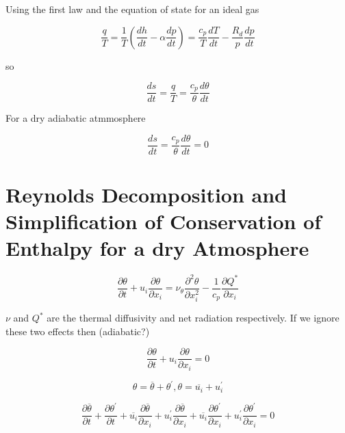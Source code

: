 Using the first law and the equation of state for an ideal gas

\begin{equation}
\frac{q}{T} = \frac{1}{T} \left(\frac{dh}{dt} - \alpha \frac{dp}{dt}\right) =  \frac{c_{p}}{T} \frac{dT}{dt} - \frac{R_{d}}{p} \frac{dp}{dt}
\end{equation}

so

\begin{equation}
\frac{ds}{dt} = \frac{q}{T} =  \frac{c_{p}}{\theta}\frac{d\theta}{dt}
\end{equation}

For a dry adiabatic atmmosphere

\begin{equation}
\frac{ds}{dt} =  \frac{c_{p}}{\theta}\frac{d\theta}{dt} = 0
\end{equation}

\section{Reynolds Decomposition and Simplification of Conservation of Enthalpy for a dry Atmosphere}

\begin{equation}
\frac{\partial \theta}{\partial t} + u_{i}\frac{\partial \theta}{\partial x_{i}} = \nu_{\theta} \frac{\partial^{2}\theta}{\partial x_{i}^{2}} - \frac{1}{c_{p}}\frac{\partial Q^{*}}{\partial x_{i}}
\end{equation}

$\nu$ and $Q^{*}$ are the thermal diffusivity and net radiation respectively.  If we ignore these two effects then (adiabatic?)

\begin{equation}
\frac{\partial \theta}{\partial t} + u_{i}\frac{\partial \theta}{\partial x_{i}} = 0
\end{equation}

\begin{equation}
\theta = \overline{\theta} + \theta^{'}, \theta = \overline{u_{i}} + u_{i}^{'} 
\end{equation}

\begin{equation}
\frac{\partial \overline{\theta}}{\partial t} + \frac{\partial \theta^{'}}{\partial t} + \overline{u_{i}}\frac{\partial \overline{\theta}}{\partial x_{i}} + u_{i}^{'}\frac{\partial \overline{\theta}}{\partial x_{i}} + \overline{u_{i}}\frac{\partial \theta^{'}}{\partial x_{i}} + u_{i}^{'}\frac{\partial \theta^{'}}{\partial x_{i}} = 0
\end{equation}

